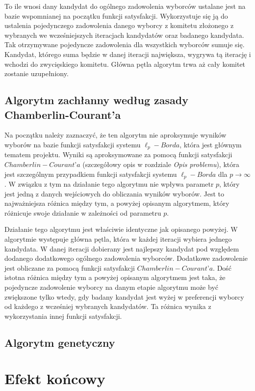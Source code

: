 \documentclass[polish,11pt]{aghthesis}
\begin{document}
To ile wnosi dany kandydat do ogólnego zadowolenia wyborców ustalane jest na bazie
wspomnianej na początku funkcji satysfakcji. Wykorzystuje się ją do ustalenia pojedynczego zadowolenia danego wyborcy z komitetu złożonego z wybranych we wcześniejszych
iteracjach kandydatów oraz badanego kandydata. Tak otrzymywane pojedyncze
zadowolenia dla wszystkich wyborców sumuje się. Kandydat, którego suma będzie w danej
iteracji największa, wygrywa tą iterację i wchodzi do zwycięskiego komitetu. Główna pętla
algorytm trwa aż cały komitet zostanie uzupełniony.

\subsection{Algorytm zachłanny według zasady Chamberlin-Courant’a}
Na początku należy zaznaczyć, że ten algorytm nie aproksymuje wyników wyborów na bazie
funkcji satysfakcji systemu $\ell_p-Borda$, która jest głównym tematem projektu. Wyniki są
aproksymowane za pomocą funkcji satysfakcji $Chamberlin-Courant’a$ (szczegółowy opis w
rozdziale \textit{Opis problemu}), która jest szczególnym przypadkiem funkcji satysfakcji systemu $\ell_p-Borda$ dla $p \to \infty$. W związku z tym na działanie tego algorytmu nie wpływa parametr $p$, który jest jedną z danych wejściowych do obliczania wyników wyborów. Jest to najważniejsza różnica między tym, a powyżej opisanym algorytmem, który różnicuje swoje działanie w zależności od parametru $p$.

Działanie tego algorytmu jest właściwie identyczne jak opisanego powyżej. W algorytmie
występuje główna pętla, która w każdej iteracji wybiera jednego kandydata. W danej iteracji
dobierany jest najlepszy kandydat pod względem dodanego dodatkowego ogólnego
zadowolenia wyborców. Dodatkowe zadowolenie jest obliczane za pomocą funkcji satysfakcji $Chamberlin-Courant’a$. Dość istotna różnica między tym a powyżej opisanym algorytmem jest
taka, że pojedyncze zadowolenie wyborcy na danym etapie algorytmu może być zwiększone
tylko wtedy, gdy badany kandydat jest wyżej w preferencji wyborcy od każdego z wcześniej
wybranych kandydatów. Ta różnica wynika z wykorzystania innej funkcji satysfakcji.

\subsection{Algorytm genetyczny}

\section{Efekt końcowy}
\end{document}
